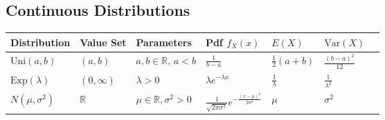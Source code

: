 \documentclass[12pt,a4paper,leqno]{report}
\newcommand{\R}{\mathbb{R}}
\newcommand{\var}{\mathrm{Var}}
\theoremstyle{plain}
\theoremstyle{definition}
\begin{document}
\subsection*{Continuous Distributions}
\begin{tabular}{ l l l l l l l}
\toprule
Distribution & Value Set & Parameters & Pdf $f_X(x)$ & $E(X)$ & $\var(X)$\\
\midrule
$\text{Uni}(a,b)$ & $(a,b)$ & $a,b \in \R,\, a < b$ & $\frac{1}{b-a}$ & $\frac{1}{2}(a+b)$ & $\frac{(b-a)^2}{12}$\\\addlinespace[5pt]
$\text{Exp}(\lambda)$ & $(0, \infty)$ & $\lambda > 0$ & $\lambda e^{-\lambda x}$ & $\frac{1}{\lambda}$ & $\frac{1}{\lambda^2}$\\\addlinespace[5pt]
$N(\mu, \sigma^2)$ & $\R$ & $\mu \in \R, \sigma^2 > 0$ & $\frac{1}{\sqrt{2\pi\sigma^2}} e^{-\frac{(x-\mu)^2}{2\sigma^2}}$ & $\mu$ & $\sigma^2$\\
\bottomrule 
\end{tabular}
\end{document}
